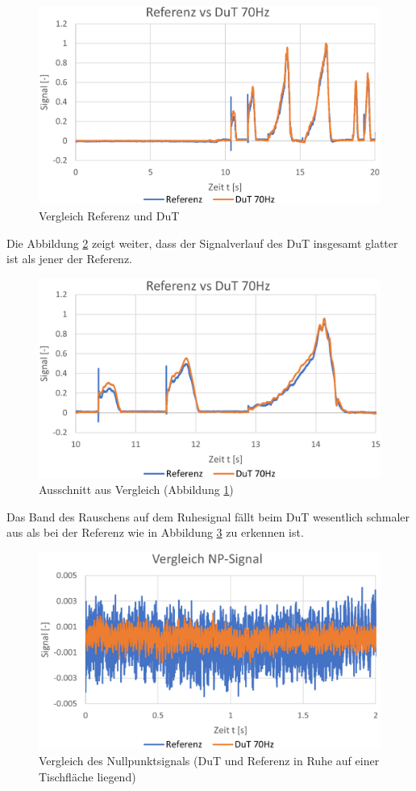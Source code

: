 \documentclass[12pt,a4paper]{article}
\begin{document}
	\begin{figure}[H]
		\centering
		\includegraphics[width=1\linewidth]{img_70Hz/comp_total}
		\caption{Vergleich Referenz und DuT}
		\label{fig:comptotal}
	\end{figure}
\noindent Die Abbildung \ref{fig:compdetail} zeigt weiter, dass der Signalverlauf des DuT insgesamt glatter ist als jener der Referenz.
	\begin{figure}[H]
		\centering
		\includegraphics[width=1\linewidth]{img_70Hz/comp_detail}
		\caption{Ausschnitt aus Vergleich (Abbildung \ref{fig:comptotal})}
		\label{fig:compdetail}
	\end{figure}
\noindent Das Band des Rauschens auf dem Ruhesignal fällt beim DuT wesentlich schmaler aus als bei der Referenz wie in Abbildung \ref{fig:compnp} zu erkennen ist.
	\begin{figure}[H]
		\centering
		\includegraphics[width=1\linewidth]{img_70Hz/comp_NP}
		\caption{Vergleich des Nullpunktsignals (DuT und Referenz in Ruhe auf einer Tischfläche liegend)}
		\label{fig:compnp}
	\end{figure}
\end{document}
